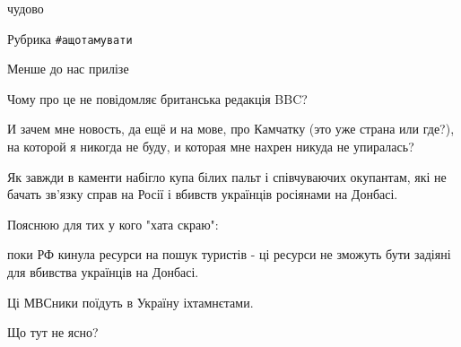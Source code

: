 \begin{itemize}
чудово


 
Рубрика \verb|#ащотамувати|

 
Менше до нас прилізе

 
Чому про це не повідомляє британська редакція BBC?

 

И зачем мне новость, да ещё и на мове, про Камчатку (это уже страна или где?),
на которой я никогда не буду, и которая мне нахрен никуда не упиралась?

 

Як завжди в каменти набігло купа білих пальт і співчуваючих окупантам, які не
бачать зв'язку справ на Росії і вбивств українців росіянами на Донбасі.

Пояснюю для тих у кого "хата скраю":

поки РФ кинула ресурси на пошук туристів - ці ресурси не зможуть бути задіяні
для вбивства українців на Донбасі.

Ці МВСники поїдуть в Україну іхтамнєтами.

Що тут не ясно?

 

\end{itemize}
